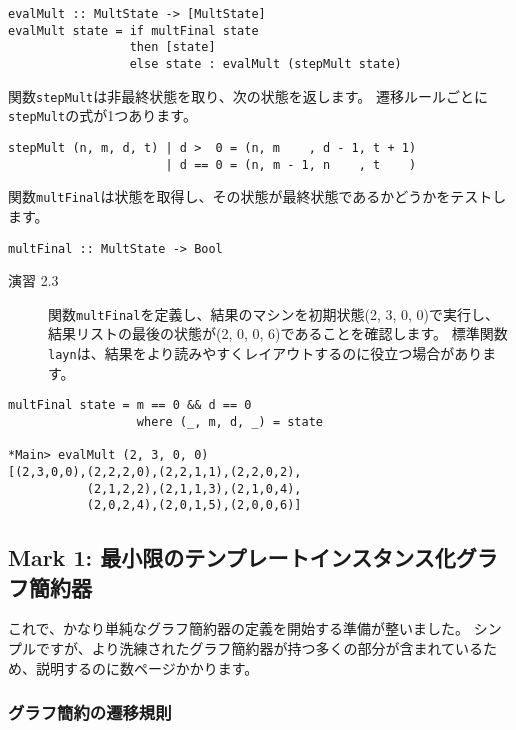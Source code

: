 \documentclass{jarticle}
\begin{document}
\begin{verbatim}
evalMult :: MultState -> [MultState]
evalMult state = if multFinal state
                 then [state]
                 else state : evalMult (stepMult state)
\end{verbatim}

関数\texttt{stepMult}は非最終状態を取り、次の状態を返します。
遷移ルールごとに\texttt{stepMult}の式が1つあります。

\begin{verbatim}
stepMult (n, m, d, t) | d >  0 = (n, m    , d - 1, t + 1)
                      | d == 0 = (n, m - 1, n    , t    )
\end{verbatim}

関数\texttt{multFinal}は状態を取得し、その状態が最終状態であるかどうかをテストします。

\begin{verbatim}
multFinal :: MultState -> Bool
\end{verbatim}

\begin{description}
	\item[演習 2.3] 関数\texttt{multFinal}を定義し、結果のマシンを初期状態(2, 3, 0, 0)で実行し、結果リストの最後の状態が(2, 0, 0, 6)であることを確認します。
		標準関数\texttt{layn}は、結果をより読みやすくレイアウトするのに役立つ場合があります。
\end{description}

\begin{verbatim}
multFinal state = m == 0 && d == 0
                  where (_, m, d, _) = state

*Main> evalMult (2, 3, 0, 0)
[(2,3,0,0),(2,2,2,0),(2,2,1,1),(2,2,0,2),
           (2,1,2,2),(2,1,1,3),(2,1,0,4),
           (2,0,2,4),(2,0,1,5),(2,0,0,6)]
\end{verbatim}
\newpage

\subsection{Mark 1: 最小限のテンプレートインスタンス化グラフ簡約器}

これで、かなり単純なグラフ簡約器の定義を開始する準備が整いました。
シンプルですが、より洗練されたグラフ簡約器が持つ多くの部分が含まれているため、説明するのに数ページかかります。

\subsubsection{グラフ簡約の遷移規則}
\end{document}
